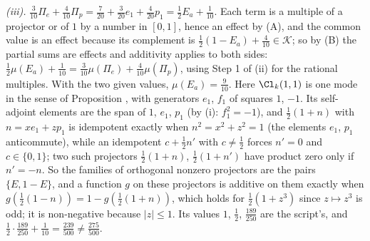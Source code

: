 \emph{(iii).} $\tfrac{3}{10}\Pi_{e} + \tfrac{4}{10}\Pi_{p} = \tfrac{7}{20} + \tfrac{3}{20}e_{1} + \tfrac{4}{20}p_{1} = \tfrac12E_{a} + \tfrac{1}{10}$. Each term is a multiple of a projector or of $1$ by a number in $[0,1]$, hence an effect by (A), and the common value is an effect because its complement is $\tfrac12(1 - E_{a}) + \tfrac{4}{10} \in \mathcal{K}$; so by (B) the partial sums are effects and additivity applies to both sides: $\tfrac12\mu(E_{a}) + \tfrac{1}{10} = \tfrac{3}{10}\mu(\Pi_{e}) + \tfrac{4}{10}\mu(\Pi_{p})$, using Step 1 of (ii) for the rational multiples. With the two given values, $\mu(E_{a}) = \tfrac{9}{10}$. Here $\Cl_{k}(1,1)$ is one mode in the sense of Proposition , with generators $e_{1}$, $f_{1}$ of squares $1$, $-1$. Its self-adjoint elements are the span of $1$, $e_{1}$, $p_{1}$ (by (i): $f_{1}^{2} = -1$), and $\tfrac12(1 + n)$ with $n = xe_{1} + zp_{1}$ is idempotent exactly when $n^{2} = x^{2} + z^{2} = 1$ (the elements $e_{1}$, $p_{1}$ anticommute), while an idempotent $c + \tfrac12 n'$ with $c \ne \tfrac12$ forces $n' = 0$ and $c \in \{0, 1\}$; two such projectors $\tfrac12(1 + n)$, $\tfrac12(1 + n')$ have product zero only if $n' = -n$. So the families of orthogonal nonzero projectors are the pairs $\{E, 1 - E\}$, and a function $g$ on these projectors is additive on them exactly when $g(\tfrac12(1 - n)) = 1 - g(\tfrac12(1 + n))$, which holds for $\tfrac12(1 + z^{3})$ since $z \mapsto z^{3}$ is odd; it is non-negative because $|z| \le 1$. Its values $1$, $\tfrac12$, $\tfrac{189}{250}$ are the script's, and $\tfrac12 \cdot \tfrac{189}{250} + \tfrac{1}{10} = \tfrac{239}{500} \ne \tfrac{275}{500}$.

